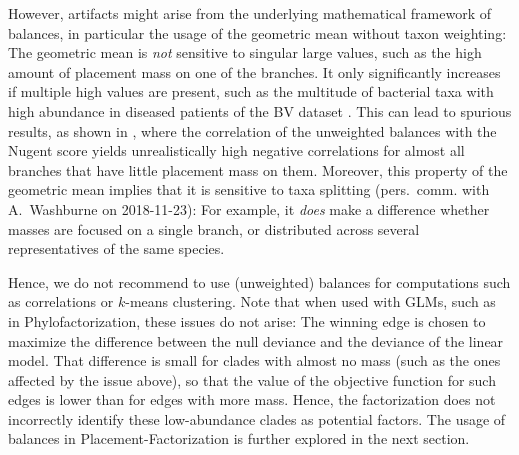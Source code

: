 However, artifacts might arise from the underlying mathematical framework of balances,
in particular the usage of the geometric mean without taxon weighting:
The geometric mean is \emph{not} sensitive to singular large values,
such as the high amount of placement mass on one of the  branches.
It only significantly increases if multiple high values are present,
such as the multitude of bacterial taxa with high abundance in diseased patients of the \ac{BV} dataset \cite{Srinivasan2012}.
This can lead to spurious results, as shown in
,
where the correlation of the unweighted balances %
with the Nugent score yields unrealistically high negative correlations
for almost all branches that have little placement mass on them.
Moreover, this property of the geometric mean implies that it is sensitive to taxa splitting
(pers.~comm. with A.~Washburne on 2018-11-23):
For example, it \emph{does} make a difference whether masses are focused on a single branch,
or distributed across several representatives of the same species.

Hence, we do not recommend to use (unweighted) balances for computations such as correlations or $k$-means clustering.
Note that when used with \acp{GLM}, such as in Phylofactorization, these issues do not arise:
The winning edge is chosen to maximize the difference between the null deviance and the deviance of the linear model.
That difference is small for clades with almost no mass (such as the ones affected by the issue above), %
so that the value of the objective function for such edges is lower than for edges with more mass.
Hence, the factorization does not incorrectly identify these low-abundance clades as potential factors.
The usage of balances in Placement-Factorization is further explored in the next section.


